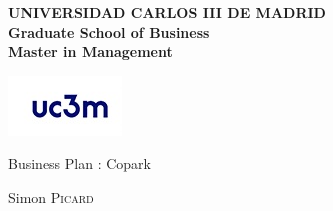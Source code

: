 \documentclass[12pt,a4paper,oneside]{book}
\begin{document}


\begin{titlepage}
\noindent \begin{minipage}{0.83\textwidth}
\noindent \textbf{UNIVERSIDAD CARLOS III DE MADRID}\hfill{}\\
\textbf{Graduate School of Business}\hfill{}\\
\textbf{Master in Management}\hfill{}
\end{minipage}
\begin{minipage}{0.17\textwidth}
\includegraphics[keepaspectratio=true,width=\textwidth]{images/logo_UC3M_universidad_Carlos_III_Madrid.jpg}
\end{minipage}
\begin{center}
\vfill{}\vfill{}\vfill{}
{\Huge Business Plan : Copark}
{\Huge \par}
\begin{center}{\LARGE Simon \textsc{Picard}}\end{center}{\Huge \par}
\vfill{}

\end{center}
\end{titlepage}
\end{document}
